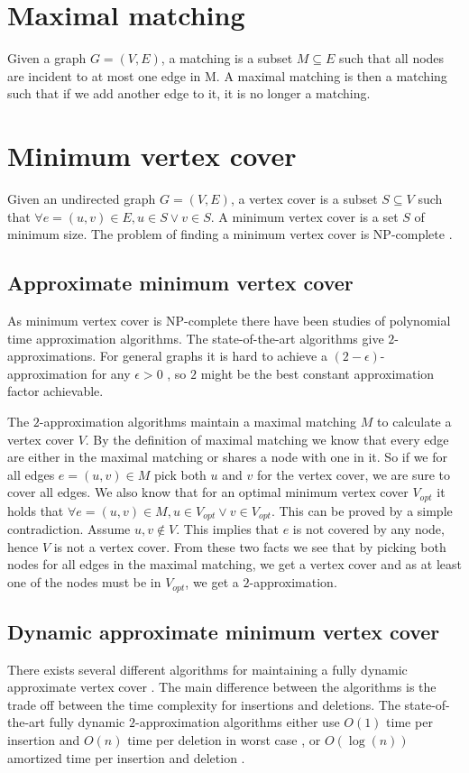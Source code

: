 \section{Maximal matching}
Given a graph $G = (V,E)$, a matching is a subset $M \subseteq E$ such that all nodes are incident to at most one edge in M. A maximal matching is then a matching such that if we add another edge to it, it is no longer a matching. 


\section{Minimum vertex cover}
Given an undirected graph $G = (V,E)$, a vertex cover is a subset $S \subseteq V$ such that $\forall e = (u,v) \in E,  u \in S \vee v \in S$. A minimum vertex cover is a set $S$ of minimum size. The problem of finding a minimum vertex cover is NP-complete \cite{Kar72}.

\subsection{Approximate minimum vertex cover}
As minimum vertex cover is NP-complete there have been studies of polynomial time approximation algorithms. The state-of-the-art algorithms give $2$-approximations. For general graphs it is hard to achieve a $(2-\epsilon)$-approximation for any $\epsilon > 0$ \cite{2-evchard}, so $2$ might be the best constant approximation factor achievable.

The $2$-approximation algorithms maintain a maximal matching $M$ to calculate a vertex cover $V$. By the definition of maximal matching we know that every edge are either in the maximal matching or shares a node with one in it. So if we for all edges $e = (u,v) \in M$ pick both $u$ and $v$ for the vertex cover, we are sure to cover all edges. We also know that for an optimal minimum vertex cover $V_{opt}$ it holds that $\forall e = (u,v) \in M, u \in V_{opt} \vee v \in V_{opt}$. This can be proved by a simple contradiction. Assume $u,v \notin V$. This implies that $e$ is not covered by any node, hence $V$ is not a vertex cover. From these two facts we see that by picking both nodes for all edges in the maximal matching, we get a vertex cover and as at least one of the nodes must be in $V_{opt}$, we get a $2$-approximation. 

\subsection{Dynamic approximate minimum vertex cover}
There exists several different algorithms for maintaining a fully dynamic approximate vertex cover \cite{2appdynvc, 2appdynvclogn, 2eappdynvc}. The main difference between the algorithms is the trade off between the time complexity for insertions and deletions. The state-of-the-art fully dynamic $2$-approximation algorithms either use $O(1)$ time per insertion and $O(n)$ time per deletion in worst case \cite{2appdynvc}, or $O(\log(n))$ amortized time per insertion and deletion \cite{2appdynvclogn}. 



